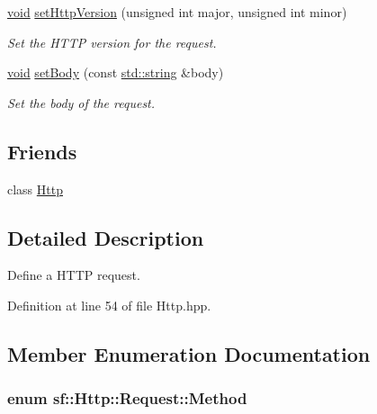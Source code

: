 \begin{DoxyCompactItemize}
\hyperlink{glutf90_8h_ac778d6f63f1aaf8ebda0ce6ac821b56e}{void} \hyperlink{classsf_1_1_http_1_1_request_aa683b607b737a6224a91387b4108d3c7}{set\-Http\-Version} (unsigned int major, unsigned int minor)
\begin{DoxyCompactList}\small\item\em Set the H\-T\-T\-P version for the request. \end{DoxyCompactList}\item 
\hyperlink{glutf90_8h_ac778d6f63f1aaf8ebda0ce6ac821b56e}{void} \hyperlink{classsf_1_1_http_1_1_request_ae9f61ec3fa1639c70e9b5780cb35578e}{set\-Body} (const \hyperlink{gl3_8h_ac83513893df92266f79a515488701770}{std\-::string} \&body)
\begin{DoxyCompactList}\small\item\em Set the body of the request. \end{DoxyCompactList}\end{DoxyCompactItemize}
\subsection*{Friends}
\begin{DoxyCompactItemize}
\item 
class \hyperlink{classsf_1_1_http_1_1_request_aba95e2a7762bb5df986048b05d03a22e}{Http}
\end{DoxyCompactItemize}


\subsection{Detailed Description}
Define a H\-T\-T\-P request. 

Definition at line 54 of file Http.\-hpp.



\subsection{Member Enumeration Documentation}
\hypertarget{classsf_1_1_http_1_1_request_a620f8bff6f43e1378f321bf53fbf5598}{
\subsubsection[{Method}]{\setlength{\rightskip}{0pt plus 5cm}enum {\bf sf\-::\-Http\-::\-Request\-::\-Method}}}\label{classsf_1_1_http_1_1_request_a620f8bff6f43e1378f321bf53fbf5598}


